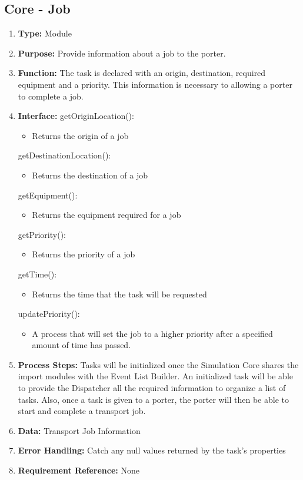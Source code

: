 \documentclass[paper=letter, fontsize=10pt]{scrartcl}
\numberwithin{equation}{section}		%
\numberwithin{figure}{section}			%
\numberwithin{table}{section}				%
\begin{document}
\subsection{Core - Job}
\begin{enumerate}[]
	\item \textbf{Type:} Module
	\item \textbf{Purpose:} Provide information about a job to the porter.
	\item \textbf{Function:} The task is declared with an origin, destination, required equipment and a priority.  This information is necessary to allowing a porter to complete a job.
	\item \textbf{Interface:} \newline
		getOriginLocation():
			\begin{itemize}
				\item Returns the origin of a job
			\end{itemize}
		getDestinationLocation():
			\begin{itemize}
				\item Returns the destination of a job
			\end{itemize}
		getEquipment():
			\begin{itemize}
				\item Returns the equipment required for a job
			\end{itemize}
		getPriority():
			\begin{itemize}
				\item Returns the priority of a job
			\end{itemize}
		getTime():
			\begin{itemize}
				\item Returns the time that the task will be requested
			\end{itemize}			
		updatePriority():
			\begin{itemize}
				\item A process that will set the job to a higher priority after a specified amount of time has passed.
			\end{itemize}
	\item \textbf{Process Steps:}  Tasks will be initialized once the Simulation Core shares the import modules with the Event List Builder.  An initialized task will be able to provide the Dispatcher all the required information to organize a list of tasks.  Also, once a task is given to a porter, the porter will then be able to start and complete a transport job.
	\item \textbf{Data:} Transport Job Information
	\item \textbf{Error Handling:} Catch any null values returned by the task's properties
	\item \textbf{Requirement Reference:} None
\end{enumerate}
\end{document}
